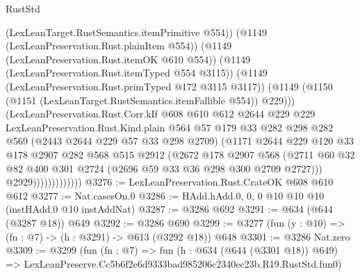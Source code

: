 \begin{lexlean}{RustStd}
\begin{coremodule}
                              (LexLeanTarget.RustSemantics.itemPrimitive @554))
                            (@1149 (LexLeanPreservation.Rust.plainItem @554))
                            (@1149 (LexLeanPreservation.Rust.itemOK @610 @554))
                            (@1149 (LexLeanPreservation.Rust.itemTyped @554 @3115))
                            (@1149 (LexLeanPreservation.Rust.primTyped @172 @3115 @3117))
                            (@1149
                              (@1150 (@1151 (LexLeanTarget.RustSemantics.itemFallible @554)) @229)))
                          (LexLeanPreservation.Rust.Corr.kIf
                            @608
                            @610
                            @612
                            @2644
                            @229
                            @229
                            LexLeanPreservation.Rust.Kind.plain
                            @564
                            @57
                            @179
                            @33
                            @282
                            @298
                            @282
                            @569
                            (@2443 @2644 @229 @57 @33 @298 @2709)
                            (@1171
                              @2644
                              @229
                              @120
                              @33
                              @178
                              @2907
                              @282
                              @568
                              @515
                              @2912
                              (@2672
                                @178
                                @2907
                                @568
                                (@2711
                                  @60
                                  @32
                                  @82
                                  @400
                                  @301
                                  @2724
                                  (@2696 @59 @33 @36 @298 @300 @2709 @2727)))
                              @2929)))))))))))))
@3276 := LexLeanPreservation.Rust.CrateOK @608 @610 @612
@3277 := Nat.casesOn.{0}
@3286 := HAdd.hAdd.{0, 0, 0} @10 @10 @10 (instHAdd.{0} @10 instAddNat)
@3287 := @3286 @692
@3291 := @634 (@644 (@3287 @18)) @649
@3292 := @3286 @690
@3299 := @3277 (fun (y : @10) => (fn : @7) -> (h : @3291) -> @613 (@3292 @18)) @648
@3301 := @3286 Nat.zero
@3309 := @3299
    (fun (fn : @7) =>
    fun (h : @634 (@644 (@3301 @18)) @649) =>
    LexLeanPreserve.Cc5b6f2e6d9333bad985206c2340ec23b.R19.RustStd.fun0)

\end{coremodule}
\end{lexlean}

